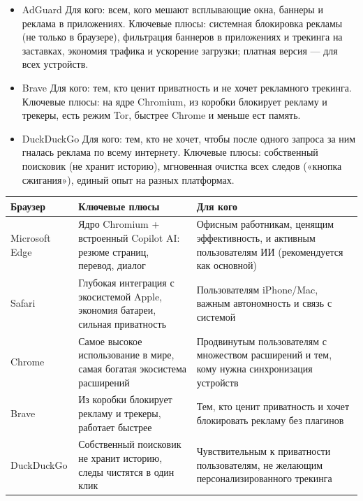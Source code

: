 
\begin{itemize}
  \item AdGuard Для кого: всем, кого мешают всплывающие окна, баннеры и реклама в приложениях. Ключевые плюсы: системная блокировка рекламы (не только в браузере), фильтрация баннеров в приложениях и трекинга на заставках, экономия трафика и ускорение загрузки; платная версия — для всех устройств.
\end{itemize}


\begin{itemize}
  \item Brave Для кого: тем, кто ценит приватность и не хочет рекламного трекинга. Ключевые плюсы: на ядре Chromium, из коробки блокирует рекламу и трекеры, есть режим Tor, быстрее Chrome и меньше ест память.
  \item DuckDuckGo Для кого: тем, кто не хочет, чтобы после одного запроса за ним гналась реклама по всему интернету. Ключевые плюсы: собственный поисковик (не хранит историю), мгновенная очистка всех следов («кнопка сжигания»), единый опыт на разных платформах.
\end{itemize}


\begin{center}
\begin{tabularx}{\linewidth}{|X|X|X|}
\hline
\textbf{Браузер} & \textbf{Ключевые плюсы} & \textbf{Для кого} \tabularnewline
\hline
Microsoft Edge & Ядро Chromium + встроенный Copilot AI: резюме страниц, перевод, диалог & Офисным работникам, ценящим эффективность, и активным пользователям ИИ (рекомендуется как основной) \tabularnewline
Safari & Глубокая интеграция с экосистемой Apple, экономия батареи, сильная приватность & Пользователям iPhone/Mac, важным автономность и связь с системой \tabularnewline
Chrome & Самое высокое использование в мире, самая богатая экосистема расширений & Продвинутым пользователям с множеством расширений и тем, кому нужна синхронизация устройств \tabularnewline
Brave & Из коробки блокирует рекламу и трекеры, работает быстрее & Тем, кто ценит приватность и хочет блокировать рекламу без плагинов \tabularnewline
DuckDuckGo & Собственный поисковик не хранит историю, следы чистятся в один клик & Чувствительным к приватности пользователям, не желающим персонализированного трекинга \tabularnewline
\hline
\end{tabularx}
\end{center}

